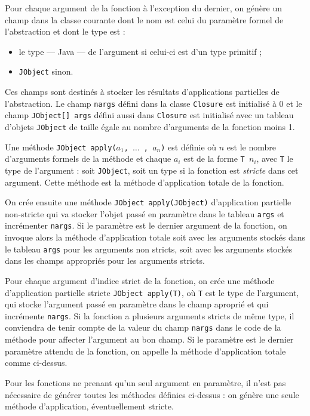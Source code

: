 Pour chaque argument de la fonction \`a l'exception du dernier, on
g\'en\`ere un champ dans la classe courante dont le nom est celui du
param\`etre formel de l'abstraction et dont le type est :
\begin{itemize}
  \item le type --- Java --- de l'argument si celui-ci est d'un type
    primitif ;
  \item  \texttt{JObject} sinon. 
\end{itemize}
Ces champs sont destin\'es \`a stocker les r\'esultats d'applications
partielles de l'abstraction. Le champ \texttt{nargs} d\'efini dans la
classe \texttt{Closure} est initialis\'e \`a 0 et le champ \texttt{JObject[]
  args} d\'efini aussi dans \texttt{Closure} est initialis\'e avec un tableau
d'objets \texttt{JObject} de taille \'egale au nombre d'arguments de la
fonction moins 1.

Une m\'ethode  \texttt{JObject apply($a_1$, $\dots$ , $a_n$)} est d\'efinie o\`u
$n$ est le nombre d'arguments formels de la m\'ethode et chaque $a_i$
est de la forme \texttt{T $n_i$}, avec \texttt{T} le type de
l'argument : soit \texttt{JObject}, soit un type si la fonction est
\emph{stricte} dans cet argument. Cette m\'ethode est la m\'ethode
d'application totale de la fonction.

On cr\'ee ensuite une m\'ethode \texttt{JObject apply(JObject)} d'application
partielle non-stricte qui va stocker l'objet pass\'e en param\`etre dans
le tableau \texttt{args} et incr\'ementer \texttt{nargs}. Si le
param\`etre est le dernier argument de la fonction, on invoque alors la
m\'ethode d'application totale soit avec les arguments stock\'es dans le
tableau \texttt{args} pour les arguments non stricts, soit avec les
arguments stock\'es dans les champs appropri\'es pour les arguments
stricts. 

Pour chaque argument d'indice strict de la fonction, on cr\'ee une m\'ethode d'application
partielle stricte \texttt{JObject apply(T)}, o\`u \texttt{T} est le type de
l'argument, qui stocke l'argument pass\'e en param\`etre dans le champ
apropri\'e et qui incr\'emente \texttt{nargs}.  Si la fonction a plusieurs
arguments stricts de m\^eme type, il conviendra de tenir compte de la
valeur du champ \texttt{nargs} dans le code de la m\'ethode pour
affecter l'argument au bon champ. Si le param\`etre est le
dernier param\`etre attendu de la fonction, on appelle la m\'ethode
d'application totale comme ci-dessus. 

Pour les fonctions ne prenant qu'un seul argument en param\`etre, il
n'est pas n\'ecessaire de g\'en\'erer toutes les m\'ethodes d\'efinies ci-dessus
: on g\'en\`ere une seule m\'ethode d'application, \'eventuellement stricte. 


